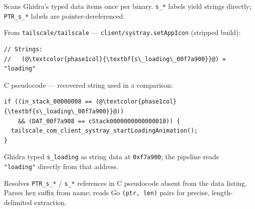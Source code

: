 \documentclass[border=10pt]{standalone}
\newcommand{\phasegap}{\vspace{8pt}}
\begin{document}
\begin{varwidth}{16cm}

\begin{tcolorbox}[
    title={\sffamily\bfseries Heuristic 1: Defined Data Scan},
    colframe=phase1col, colback=codebg, colbacktitle=phase1col!15!white,
    coltitle=phase1col, fonttitle=\small,
    width=16cm, boxrule=0.5pt, left=3pt, right=3pt, top=2pt, bottom=2pt,
    subtitle style={colback=phase1col!8!white, coltitle=phase1col},
]
\small\sffamily Scans Ghidra's typed data items once per binary.
\texttt{s\_*} labels yield strings directly; \texttt{PTR\_s\_*} labels are pointer-dereferenced.

\tcblower

{\scriptsize\sffamily\color{labelgray} From \texttt{tailscale/tailscale} --- \texttt{client/systray.setAppIcon} (stripped build):}
\vspace{2pt}
\begin{lstlisting}[style=annot]
// Strings:
//   (@\textcolor{phase1col}{\textbf{s\_loading\_00f7a900}}@) = "loading"
\end{lstlisting}
\vspace{2pt}
{\scriptsize\sffamily\color{labelgray} C pseudocode --- recovered string used in a comparison:}
\begin{lstlisting}[style=cstyle]
if ((in_stack_00000008 == (@\textcolor{phase1col}{\textbf{s\_loading\_00f7a900}}@))
    && (DAT_00f7a908 == cStack0000000000000010)) {
  tailscale_com_client_systray_startLoadingAnimation();
}
\end{lstlisting}
{\scriptsize\sffamily\color{labelgray} Ghidra typed \texttt{s\_loading} as string data at \texttt{0xf7a900}; the pipeline reads \texttt{"loading"} directly from that address.}
\end{tcolorbox}

\phasegap

\begin{tcolorbox}[
    title={\sffamily\bfseries Heuristic 2: Undefined Data Resolution},
    colframe=phase2col, colback=codebg, colbacktitle=phase2col!15!white,
    coltitle=phase2col, fonttitle=\small,
    width=16cm, boxrule=0.5pt, left=3pt, right=3pt, top=2pt, bottom=2pt,
    subtitle style={colback=phase2col!8!white, coltitle=phase2col},
]
\small\sffamily Resolves \texttt{PTR\_s\_*} / \texttt{s\_*} references in C pseudocode absent from the data listing.
Parses hex suffix from name; reads Go \texttt{(ptr, len)} pairs for precise, length-delimited extraction.


\end{tcolorbox}
\end{varwidth}
\end{document}
